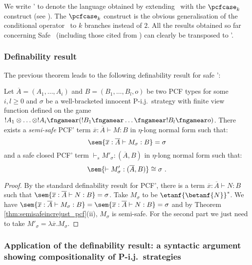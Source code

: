 We write \pcf' to denote the language obtained by extending \pcf\
with the $\pcfcase_k$ construct (see \cite{Abr02}).
The $\pcfcase_k$ construct is the obvious generalisation of the
conditional operator \pcfcond\ to $k$ branches instead of $2$. All the results obtained so far concerning Safe \pcf\ (including those
cited from \cite{blumtransfer}) can clearly be transposed to \pcf'.

\subsubsection{Definability result}

The previous theorem leads to the following definability result for safe \pcf':
\begin{proposition}
\label{prop:safetydefinability}
Let $\overline{A}=(A_1,\ldots, A_i)$ and $B =(B_1, \ldots, B_l,o)$ be two PCF types for some $i,l\geq 0$ and $\sigma$ be a well-bracketed innocent
P-i.j.\ strategy with finite view function defined on the game $!A_1 \otimes \ldots \otimes !A_i \fngamear (!B_1 \fngamear \ldots \fngamear !B_l \fngamear o) $. There exists a \emph{semi-safe} PCF' term $\overline{x} : \overline{A} \vdash M : B$ in $\eta$-long normal form such that:
$$ \sem{\overline{x} : \overline{A} \vdash M_\sigma : B} = \sigma $$
and a safe closed PCF' term $\vdash_s M'_\sigma : (\overline{A},B)$ in $\eta$-long normal form such that:
$$ \sem{\vdash M'_\sigma : (\overline{A},B)} \cong \sigma \ .$$
\end{proposition}
\begin{proof}
By the standard definability result for PCF', there is a term $\overline{x} : \overline{A} \vdash N : B$ such that $\sem{\overline{x} :\overline{A} \vdash N : B} = \sigma$.
Take $M_\sigma$ to be $\etanf{\betanf{N}}^* $. We have $\sem{\overline{x} : \overline{A} \vdash M_\sigma : B} =  \sem{\overline{x} :\overline{A} \vdash N : B} = \sigma$ and by Theorem  \ref{thm:semisafeincrejust_pcf}(ii), $M_\sigma$ is semi-safe.
For the second part we just need to take $M'_\sigma = \lambda \overline{x}. M_\sigma$.
\end{proof}



\subsubsection{Application of the definability result: a syntactic
argument showing compositionality of P-i.j.\ strategies}


